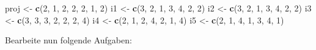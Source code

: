 \documentclass[]{article}
\newenvironment{Shaded}{\begin{snugshade}}{\end{snugshade}}
\newcommand{\KeywordTok}[1]{\textcolor[rgb]{0.13,0.29,0.53}{\textbf{#1}}}
\newcommand{\DecValTok}[1]{\textcolor[rgb]{0.00,0.00,0.81}{#1}}
\newcommand{\StringTok}[1]{\textcolor[rgb]{0.31,0.60,0.02}{#1}}
\newcommand{\NormalTok}[1]{#1}
\begin{document}
\begin{Shaded}
\begin{Highlighting}[]
\NormalTok{    proj   <-}\StringTok{ }\KeywordTok{c}\NormalTok{(}\DecValTok{2}\NormalTok{, }\DecValTok{1}\NormalTok{, }\DecValTok{2}\NormalTok{, }\DecValTok{2}\NormalTok{, }\DecValTok{2}\NormalTok{, }\DecValTok{1}\NormalTok{, }\DecValTok{2}\NormalTok{)}
\NormalTok{    i1     <-}\StringTok{ }\KeywordTok{c}\NormalTok{(}\DecValTok{3}\NormalTok{, }\DecValTok{2}\NormalTok{, }\DecValTok{1}\NormalTok{, }\DecValTok{3}\NormalTok{, }\DecValTok{4}\NormalTok{, }\DecValTok{2}\NormalTok{, }\DecValTok{2}\NormalTok{)}
\NormalTok{    i2     <-}\StringTok{ }\KeywordTok{c}\NormalTok{(}\DecValTok{3}\NormalTok{, }\DecValTok{2}\NormalTok{, }\DecValTok{1}\NormalTok{, }\DecValTok{3}\NormalTok{, }\DecValTok{4}\NormalTok{, }\DecValTok{2}\NormalTok{, }\DecValTok{2}\NormalTok{)}
\NormalTok{    i3     <-}\StringTok{ }\KeywordTok{c}\NormalTok{(}\DecValTok{3}\NormalTok{, }\DecValTok{3}\NormalTok{, }\DecValTok{3}\NormalTok{, }\DecValTok{2}\NormalTok{, }\DecValTok{2}\NormalTok{, }\DecValTok{2}\NormalTok{, }\DecValTok{4}\NormalTok{)}
\NormalTok{    i4     <-}\StringTok{ }\KeywordTok{c}\NormalTok{(}\DecValTok{2}\NormalTok{, }\DecValTok{1}\NormalTok{, }\DecValTok{2}\NormalTok{, }\DecValTok{4}\NormalTok{, }\DecValTok{2}\NormalTok{, }\DecValTok{1}\NormalTok{, }\DecValTok{4}\NormalTok{)}
\NormalTok{    i5     <-}\StringTok{ }\KeywordTok{c}\NormalTok{(}\DecValTok{2}\NormalTok{, }\DecValTok{1}\NormalTok{, }\DecValTok{4}\NormalTok{, }\DecValTok{1}\NormalTok{, }\DecValTok{3}\NormalTok{, }\DecValTok{4}\NormalTok{, }\DecValTok{1}\NormalTok{)}
\end{Highlighting}
\end{Shaded}

Bearbeite nun folgende Aufgaben:
\end{document}
